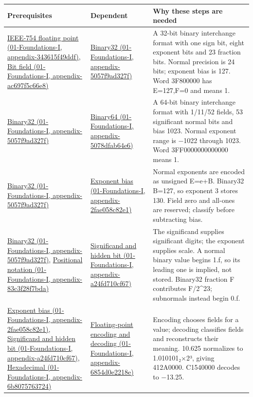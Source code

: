 {\def\LTcaptype{none} %
\begin{longtable}[]{@{}
  >{\raggedright\arraybackslash}p{}
  >{\raggedright\arraybackslash}p{}
  >{\raggedright\arraybackslash}p{}@{}}
\toprule\noalign{}
\begin{minipage}[b]{\linewidth}\raggedright
Prerequisites
\end{minipage} & \begin{minipage}[b]{\linewidth}\raggedright
Dependent
\end{minipage} & \begin{minipage}[b]{\linewidth}\raggedright
Why these steps are needed
\end{minipage} \\
\midrule\noalign{}
\endhead
\bottomrule\noalign{}
\endlastfoot
\href{}{IEEE-754 floating point (01-Foundations-I, appendix-343615f49ddf)}, \href{}{Bit field (01-Foundations-I, appendix-ac697f5c66e8)} & \href{}{Binary32 (01-Foundations-I, appendix-5057f9ad327f)} & A 32-bit binary interchange format with one sign bit, eight exponent bits and 23 fraction bits. Normal precision is 24 bits; exponent bias is 127. Word 3F800000 has E=127,F=0 and means 1. \\
\href{}{Binary32 (01-Foundations-I, appendix-5057f9ad327f)} & \href{}{Binary64 (01-Foundations-I, appendix-5078dfab64e6)} & A 64-bit binary interchange format with 1/11/52 fields, 53 significant normal bits and bias 1023. Normal exponent range is −1022 through 1023. Word 3FF0000000000000 means 1. \\
\href{}{Binary32 (01-Foundations-I, appendix-5057f9ad327f)} & \href{}{Exponent bias (01-Foundations-I, appendix-2fae058c82e1)} & Normal exponents are encoded as unsigned E=e+B. Binary32 B=127, so exponent 3 stores 130. Field zero and all-ones are reserved; classify before subtracting bias. \\
\href{}{Binary32 (01-Foundations-I, appendix-5057f9ad327f)}, \href{}{Positional notation (01-Foundations-I, appendix-83c3f28f7bda)} & \href{}{Significand and hidden bit (01-Foundations-I, appendix-a24fd710cf67)} & The significand supplies significant digits; the exponent supplies scale. A normal binary value begins 1.f, so its leading one is implied, not stored. Binary32 fraction F contributes F/2\^{}23; subnormals instead begin 0.f. \\
\href{}{Exponent bias (01-Foundations-I, appendix-2fae058c82e1)}, \href{}{Significand and hidden bit (01-Foundations-I, appendix-a24fd710cf67)}, \href{}{Hexadecimal (01-Foundations-I, appendix-6b8075763724)} & \href{}{Floating-point encoding and decoding (01-Foundations-I, appendix-6854d0e2218e)} & Encoding chooses fields for a value; decoding classifies fields and reconstructs their meaning. 10.625 normalizes to 1.010101₂×2³, giving 412A0000. C1540000 decodes to −13.25. \\

\end{longtable}}
